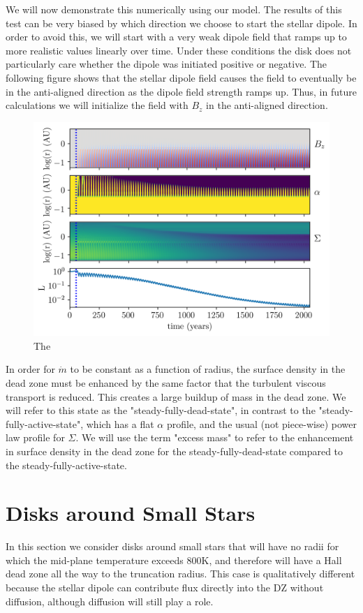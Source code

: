 We will now demonstrate this numerically using our model.  The results of this test can be very biased by which direction we choose to start the stellar dipole.  In order to avoid this, we will start with a very weak dipole field that ramps up to more realistic values linearly over time.  Under these conditions the disk does not particularly care whether the dipole was initiated positive or negative.  The following figure shows that the stellar dipole field causes the field to eventually be in the anti-aligned direction as the dipole field strength ramps up.  Thus, in future calculations we will initialize the field with $B_z$ in the anti-aligned direction.    

\begin{figure}[p]
\centering
\includegraphics[width=0.7\columnwidth]{figs/figsChapter3/run3077/MST1.png}
\caption{The}
\label{fiStExample}
\end{figure}

 In order for $\dot{m}$ to be constant as a function of radius, the surface density in the dead zone must be enhanced by the same factor that the turbulent viscous transport is reduced.  This creates a large buildup of mass in the dead zone.  We will refer to this state as the "steady-fully-dead-state", in contrast to the "steady-fully-active-state", which has a flat $\alpha$ profile, and the usual (not piece-wise) power law profile for $\Sigma$.  We will use the term "excess mass" to refer to the enhancement in surface density in the dead zone for the steady-fully-dead-state compared to the steady-fully-active-state.   




\newpage
\section{Disks around Small Stars}
In this section we consider disks around small stars that will have no radii for which the mid-plane temperature exceeds 800K, and therefore will have a Hall dead zone all the way to the truncation radius.  This case is qualitatively different because the stellar dipole can contribute flux directly into the DZ without diffusion, although diffusion will still play a role.  

